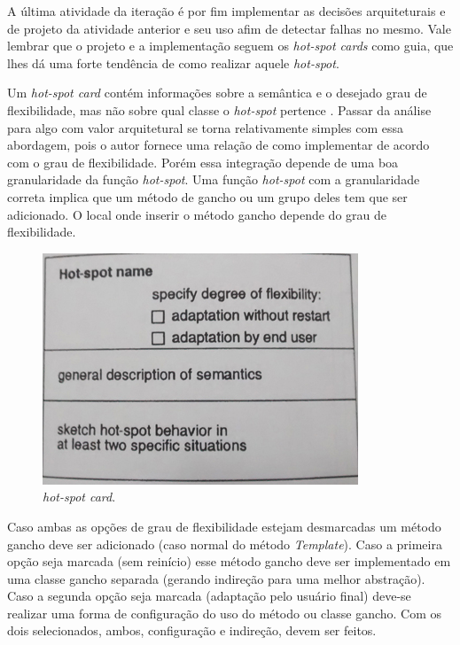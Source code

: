 A última atividade da iteração é por fim implementar as decisões arquiteturais e de projeto da atividade anterior e seu uso afim de detectar falhas no mesmo. Vale lembrar que o projeto e a implementação seguem os \textit{hot-spot cards} como guia, que lhes dá uma forte tendência de como realizar aquele \textit{hot-spot}.

Um \textit{hot-spot card} contém informações sobre a semântica e o desejado grau de flexibilidade, mas não sobre qual classe o \textit{hot-spot} pertence \cite{Fayad1999}. Passar da análise para algo com valor arquitetural se torna relativamente simples com essa abordagem, pois o autor fornece uma relação de como implementar de acordo com o grau de flexibilidade. Porém essa integração depende de uma boa granularidade da função \textit{hot-spot}. Uma função \textit{hot-spot} com a granularidade correta implica que um método de gancho ou um grupo deles tem que ser adicionado. O local onde inserir o método gancho depende do grau de flexibilidade.

\begin{figure}[h]
	\centering
	\label{fig16}
		\includegraphics[keepaspectratio=true,scale=0.4]{figuras/hotspotcard.jpg}
	\caption{\textit{hot-spot card}. \cite{Fayad1999}}
\end{figure}

Caso ambas as opções de grau de flexibilidade estejam desmarcadas um método gancho deve ser adicionado (caso normal do método \textit{Template}). Caso a primeira opção seja marcada (sem reinício) esse método gancho deve ser implementado em uma classe gancho separada (gerando indireção para uma melhor abstração). Caso a segunda opção seja marcada (adaptação pelo usuário final) deve-se realizar uma forma de configuração do uso do método ou classe gancho. Com os dois selecionados, ambos, configuração e indireção, devem ser feitos.

